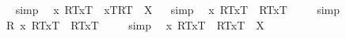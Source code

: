 \begin{isabellebody}
\isadelimproof
\ %
\endisadelimproof
%
\isatagproof
{}\isamarkupfalse%
\ simp\ \isamarkupfalse%
%
\endisatagproof
{\isafoldproof}%
%
\isadelimproof
%
\endisadelimproof
\isanewline
{}\isamarkupfalse%
\ {\isachardoublequoteopen}{\isacharparenleft}\isactrlbold {\isasymlambda}x{\isachardot}\ {\isasymlparr}R\isactrlsup T{\isacharcomma}x\isactrlsup T{\isasymrparr}\ \isactrlbold {\isasymrightarrow}\ {\isasymlbrace}x\isactrlsup T{\isacharcomma}R\isactrlsup T{\isasymrbrace}{\isacharparenright}\ {\isacharequal}\ X{\isachardoublequoteclose}%
\isadelimproof
\ %
\endisadelimproof
%
\isatagproof
{}\isamarkupfalse%
\ simp\ \isamarkupfalse%
%
\endisatagproof
{\isafoldproof}%
%
\isadelimproof
%
\endisadelimproof
\isanewline
\isanewline
{}\isamarkupfalse%
\ {\isachardoublequoteopen}{\isacharbrackleft}{\isacharparenleft}\isactrlbold {\isasymforall}x{\isachardot}\ {\isasymlparr}R\isactrlsup T{\isacharcomma}x\isactrlsup T{\isasymrparr}\ \isactrlbold {\isasymrightarrow}\ {\isasymlparr}R\isactrlsup T{\isacharcomma}x\isactrlsup T{\isasymrparr}{\isacharparenright}{\isacharbrackright}\ {\isacharequal}\ {\isasymtop}{\isachardoublequoteclose}%
\isadelimproof
\ %
\endisadelimproof
%
\isatagproof
{}\isamarkupfalse%
\ simp\ \isamarkupfalse%
%
\endisatagproof
{\isafoldproof}%
%
\isadelimproof
%
\endisadelimproof
\isanewline
{}\isamarkupfalse%
\ {\isachardoublequoteopen}{\isacharbrackleft}{\isacharparenleft}\isactrlbold {\isasymforall}R{\isachardot}\ \isactrlbold {\isasymforall}{\isacharparenleft}{\isasymlambda}x{\isachardot}\ {\isasymlparr}R\isactrlsup T{\isacharcomma}x\isactrlsup T{\isasymrparr}\ \isactrlbold {\isasymrightarrow}\ {\isasymlparr}R\isactrlsup T{\isacharcomma}x\isactrlsup T{\isasymrparr}{\isacharparenright}{\isacharparenright}{\isacharbrackright}\ {\isacharequal}\ {\isasymtop}{\isachardoublequoteclose}%
\isadelimproof
\ %
\endisadelimproof
%
\isatagproof
{}\isamarkupfalse%
\ simp\ \isamarkupfalse%
%
\endisatagproof
{\isafoldproof}%
%
\isadelimproof
%
\endisadelimproof
\isanewline
{}\isamarkupfalse%
\ {\isachardoublequoteopen}{\isacharparenleft}\isactrlbold {\isasymforall}x{\isachardot}\ {\isasymlparr}R\isactrlsup T{\isacharcomma}x\isactrlsup T{\isasymrparr}\ \isactrlbold {\isasymrightarrow}\ {\isasymlparr}R\isactrlsup T{\isacharcomma}x\isactrlsup T{\isasymrparr}{\isacharparenright}\ {\isacharequal}\ X{\isachardoublequoteclose}%
\isadelimproof
\ %
\endisadelimproof
%
\isatagproof

\end{isabellebody}
